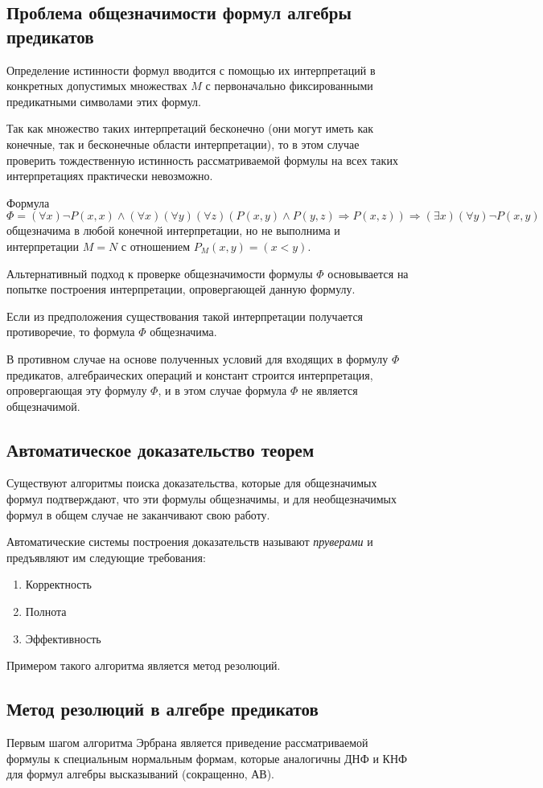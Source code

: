 \subsection*{Проблема общезначимости формул алгебры предикатов}
Определение истинности формул вводится с помощью их интерпретаций в конкретных допустимых множествах $M$ с первоначально 
фиксированными предикатными символами этих формул. 

Так как множество таких интерпретаций бесконечно (они могут иметь как конечные, так и бесконечные области интерпретации), то в этом случае  проверить тождественную истинность рассматриваемой формулы на всех таких 
интерпретациях практически невозможно.

\begin{example}
    Формула 
    $$\Phi = (\forall x)\lnot P(x,x)\land(\forall x)(\forall y)(\forall z)(P(x,y)\land P(y,z)\Rightarrow P(x,z))\Rightarrow(\exists x)(\forall y)\lnot P(x,y)$$
    общезначима в любой конечной интерпретации, но не выполнима и интерпретации $M=N$ с отношением $P_M(x,y) = (x < y)$.
\end{example}

Альтернативный подход к проверке общезначимости 
формулы $\Phi$ основывается на попытке построения 
интерпретации, опровергающей данную формулу. 

Если из предположения существования такой 
интерпретации получается противоречие, то формула 
$\Phi$ общезначима. 

В противном случае на основе 
полученных условий для входящих в формулу $\Phi$
предикатов, алгебраических операций и констант 
строится интерпретация, опровергающая эту формулу 
$\Phi$, и в этом случае формула $\Phi$ не является 
общезначимой. 

\subsection*{Автоматическое доказательство теорем}

Существуют алгоритмы поиска доказательства, 
которые для общезначимых формул 
подтверждают, что эти формулы общезначимы, и 
для необщезначимых формул в общем случае не 
заканчивают свою работу.

Автоматические системы построения 
доказательств называют \textit{пруверами} и предъявляют 
им следующие требования:
\begin{enumerate}
    \item Корректность
    \item Полнота
    \item Эффективность
\end{enumerate}

Примером такого алгоритма является метод резолюций.

\subsection*{Метод резолюций в алгебре предикатов}

Первым шагом алгоритма Эрбрана является приведение рассматриваемой формулы к специальным нормальным формам, которые аналогичны ДНФ и КНФ для формул алгебры высказываний (сокращенно, АВ). 

